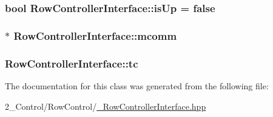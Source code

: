 \subsubsection[{\texorpdfstring{is\+Up}{isUp}}]{\setlength{\rightskip}{0pt plus 5cm}bool Row\+Controller\+Interface\+::is\+Up = false\hspace{0.3cm}{\ttfamily [protected]}}\hypertarget{class_row_controller_interface_a7d25dba642a119990388be3452963cc5}{}\label{class_row_controller_interface_a7d25dba642a119990388be3452963cc5}
\subsubsection[{\texorpdfstring{mcomm}{mcomm}}]{$\ast$ Row\+Controller\+Interface\+::mcomm\hspace{0.3cm}{\ttfamily [protected]}}\hypertarget{class_row_controller_interface_a14b23ce7b593d4be9907f6ffea7f9531}{}\label{class_row_controller_interface_a14b23ce7b593d4be9907f6ffea7f9531}
\subsubsection[{\texorpdfstring{tc}{tc}}]{ Row\+Controller\+Interface\+::tc\hspace{0.3cm}{\ttfamily [protected]}}\hypertarget{class_row_controller_interface_abb1c698ede5467ee0f60acf8b5a38f96}{}\label{class_row_controller_interface_abb1c698ede5467ee0f60acf8b5a38f96}


The documentation for this class was generated from the following file\+:\begin{DoxyCompactItemize}
\item 
2\+\_\+\+Control/\+Row\+Control/\hyperlink{___row_controller_interface_8hpp}{\+\_\+\+Row\+Controller\+Interface.\+hpp}\end{DoxyCompactItemize}
